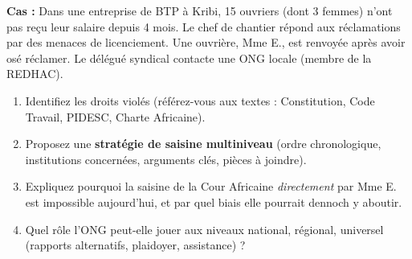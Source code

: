 \documentclass[11pt]{article}
\begin{document}
\begin{exercice}
\textbf{Cas :} Dans une entreprise de BTP à Kribi, 15 ouvriers (dont 3 femmes) n'ont pas reçu leur salaire depuis 4 mois. Le chef de chantier répond aux réclamations par des menaces de licenciement. Une ouvrière, Mme E., est renvoyée après avoir osé réclamer. Le délégué syndical contacte une ONG locale (membre de la REDHAC).
\begin{enumerate}
  \item Identifiez les droits violés (référez-vous aux textes : Constitution, Code Travail, PIDESC, Charte Africaine).
  \item Proposez une \textbf{stratégie de saisine multiniveau} (ordre chronologique, institutions concernées, arguments clés, pièces à joindre).
  \item Expliquez pourquoi la saisine de la Cour Africaine \emph{directement} par Mme E. est impossible aujourd'hui, et par quel biais elle pourrait dennoch y aboutir.
  \item Quel rôle l'ONG peut-elle jouer aux niveaux national, régional, universel (rapports alternatifs, plaidoyer, assistance) ?
\end{enumerate}
\end{exercice}
\end{document}
